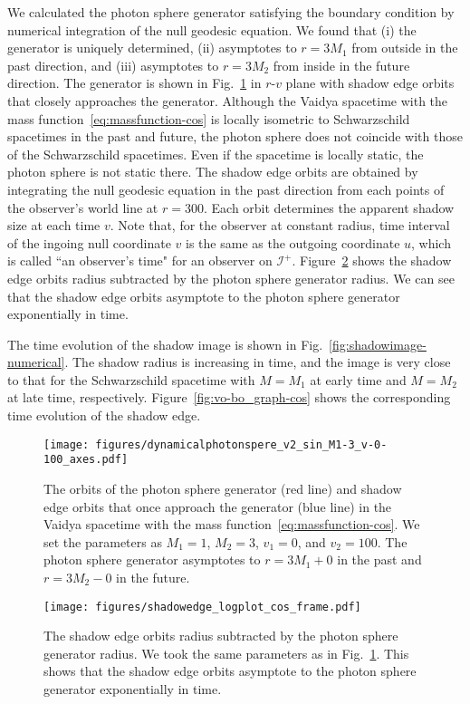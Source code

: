 \documentclass[prd,showpacs,preprintnumbers,groupedaddress,superscriptaddress,nofootinbib,11pt]{revtex4-1} %
\theoremstyle{newplain}
\begin{document}
We calculated the photon sphere generator satisfying the boundary condition by numerical integration of the null geodesic equation.
We found that (i) the generator is uniquely determined, (ii) asymptotes to $r=3M_1$ from outside in the past direction, and (iii) asymptotes to $r=3M_2$ from inside in the future direction.
The generator is shown in Fig.~\ref{fig:psgenerator-numerical} in $r$-$v$ plane with shadow edge orbits that closely approaches the generator.
Although the Vaidya spacetime with the mass function~\eqref{eq:massfunction-cos} is locally isometric to Schwarzschild spacetimes in the past and future, the photon sphere does not coincide with those of the Schwarzschild spacetimes.
Even if the spacetime is locally static, the photon sphere is not static there.
The shadow edge orbits are obtained by integrating the null geodesic equation in the past direction from each points of the observer's world line at $r=300$.
Each orbit determines the apparent shadow size at each time $v$.
Note that, for the observer at constant radius, time interval of the ingoing null coordinate $v$ is the same as the outgoing coordinate $u$, which is called ``an observer's time" for an observer on $\mathscr{I}^+$.
Figure~\ref{fig:psgenerator-numerical-logplot} shows the shadow edge orbits radius subtracted by the photon sphere generator radius.
We can see that the shadow edge orbits 
asymptote to the photon sphere generator exponentially in time.


The time evolution of the shadow image is shown in Fig.~\ref{fig:shadowimage-numerical}.
The shadow radius is increasing in time,
and the image is very close to that for the Schwarzschild spacetime with $M=M_1$ at early time and $M=M_2$ at late time, respectively.
Figure~\ref{fig:vo-bo_graph-cos} shows the corresponding time evolution of the shadow edge.

\begin{figure}[h]%
\texttt{[image: figures/dynamicalphotonspere\_v2\_sin\_M1-3\_v-0-100\_axes.pdf]}
\caption{\label{fig:psgenerator-numerical} 
The orbits of the photon sphere generator (red line) and shadow edge orbits that once approach the generator (blue line)
in the Vaidya spacetime with the mass function~\eqref{eq:massfunction-cos}. We set the parameters as $M_1=1$, $M_2=3$, $v_1=0$, and $v_2=100$.
The photon sphere generator asymptotes to $r=3M_1+0$ in the past and $r=3M_2-0$ in the future.
}
\end{figure}


\begin{figure}[h]%
\texttt{[image: figures/shadowedge\_logplot\_cos\_frame.pdf]}
\caption{\label{fig:psgenerator-numerical-logplot} 
The shadow edge orbits radius subtracted by the photon sphere generator radius.
We took the same parameters as in Fig.~\ref{fig:psgenerator-numerical}.
This shows that the shadow edge orbits 
asymptote to the photon sphere generator exponentially in time.
}
\end{figure}
\end{document}

